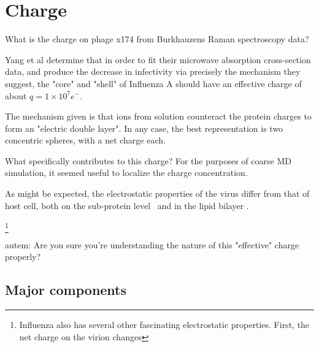 \documentclass[paper.tex]{subfiles}
\begin{document}
	


\section{Charge}


\begin{autem}
	What is the charge on phage x174 from Burkhauzens Raman spectroscopy data?
\end{autem}

Yang et al determine that in order to fit their microwave absorption cross-section data, and produce the decrease in infectivity via precisely the mechanism they suggest, the "core" and "shell" of Influenza A should have an effective charge of about $q=1 \times 10^7 e^-$. 

The mechanism given is that ions from solution counteract the protein charges to form an "electric double layer". In any case, the best representation is two concentric spheres, with a net charge each.

What specifically contributes to this charge? For the purposes of coarse MD simulation, it seemed useful to localize the charge concentration. 

As might be expected, the electrostatic properties of the virus differ from that of host cell, both on the sub-protein level\cite{Icosahedral2019} \footnotemark \ and in the lipid bilayer \cite{Lipid2015} \footnotemark. 



\footnote{Influenza also has several other fascinating electrostatic properties. First, the net charge on the virion changes}

\begin{autem}
	autem: Are you sure you're understanding the nature of this "effective" charge properly?
\end{autem}

\subsection{Major components}
\end{document}

